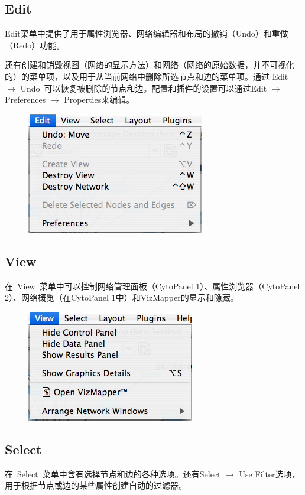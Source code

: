 	\subsection{Edit}
	Edit菜单中提供了用于属性浏览器、网络编辑器和布局的撤销（Undo）和重做（Redo）功能。
	
	还有创建和销毁视图（网络的显示方法）和网络（网络的原始数据，并不可视化的）的菜单项，以及用于从当前网络中删除所选节点和边的菜单项。通过 Edit $\rightarrow$ Undo~可以恢复被删除的节点和边。配置和插件的设置可以通过Edit $\rightarrow$ Preferences $\rightarrow$ Properties来编辑。

	\begin{figure}[!h]
	\centerline{\includegraphics[scale=0.6]{images/menu_edit_26.png}}
	\end{figure}

	\subsection{View}
在~View~菜单中可以控制网络管理面板（CytoPanel 1）、属性浏览器（CytoPanel 2）、网络概览（在CytoPanel
1中）和VizMapper的显示和隐藏。

	\begin{figure}[!h]
	\centerline{\includegraphics[scale=0.6]{images/menu_view_26.png}}
	\end{figure}

	\subsection{Select}
	在~Select~菜单中含有选择节点和边的各种选项。还有Select $\rightarrow$ Use Filter选项，用于根据节点或边的某些属性创建自动的过滤器。

